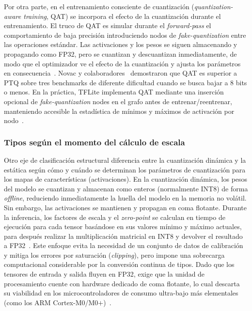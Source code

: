 \documentclass[a4paper,12pt,twoside,final]{book}
\begin{document}
Por otra parte, en el entrenamiento consciente de cuantización (\textit{quantization-aware training}, QAT) se
incorpora el efecto de la cuantización durante el entrenamiento. El truco de QAT es simular durante el
\textit{forward-pass} el comportamiento de baja precisión introduciendo nodos de \textit{fake-quantization} entre las
operaciones estándar. Las activaciones y los pesos se siguen almacenando y propagando como FP32, pero se cuantizan
y descuantizan inmediatamente, de modo que el optimizador ve el efecto de la cuantización y ajusta los parámetros en
consecuencia~\cite{menghani2023acm}. Novac y colaboradores~\cite{novac2021sensors} demostraron que QAT es superior a
PTQ sobre tres benchmarks de diferente dificultad cuando se busca bajar a 8 bits o menos. En la práctica, TFLite
implementa QAT mediante una inserción opcional de \textit{fake-quantization} nodes en el grafo antes de
entrenar/reentrenar, manteniendo accesible la estadística de mínimos y máximos de activación por
nodo~\cite{menghani2023acm}.

\subsubsection{Tipos según el momento del cálculo de escala}
Otro eje de clasificación estructural diferencia entre la cuantización dinámica y la estática según cómo y cuándo se
determinan los parámetros de cuantización para los mapas de características (activaciones). En la cuantización
dinámica, los pesos del modelo se cuantizan y almacenan como enteros (normalmente INT8) de forma \textit{offline},
reduciendo inmediatamente la huella del modelo en la memoria no volátil. Sin embargo, las activaciones se mantienen y
propagan en coma flotante. Durante la inferencia, los factores de escala y el \textit{zero-point} se calculan en
tiempo de ejecución para cada tensor basándose en sus valores mínimo y máximo actuales, para después realizar la
multiplicación matricial en INT8 y devolver el resultado a FP32~\cite{gholami2022lowpowercv}. Este enfoque evita la
necesidad de un conjunto de datos de calibración y mitiga los errores por saturación (\textit{clipping}), pero impone
una sobrecarga computacional considerable por la conversión continua de tipos. Dado que los tensores de entrada y
salida fluyen en FP32, exige que la unidad de procesamiento cuente con hardware dedicado de coma flotante, lo cual
descarta su viabilidad en los microcontroladores de consumo ultra-bajo más elementales (como los ARM
Cortex-M0/M0$+$)~\cite{novac2021sensors}.\\
\end{document}
